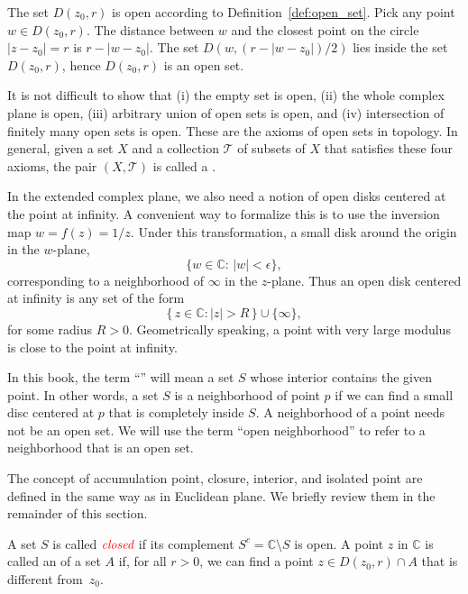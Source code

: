 \begin{example}
	The set $D(z_0,r)$ is open according to Definition~\ref{def:open_set}. Pick any point $w\in D(z_0,r)$. The distance between $w$ and the closest point on the circle $|z-z_0|=r$ is  $r - |w-z_0|$. The set $D(w, (r-|w-z_0|)/2)$ lies inside the set $D(z_0,r)$, hence $D(z_0,r)$ is an open set.
\end{example}

It is not difficult to show that (i) the empty set is open, (ii) the whole complex plane is open, (iii) arbitrary union of open sets is open, and (iv) intersection of finitely many open sets is open. These are the axioms of open sets in topology. In general, given a set $X$ and a collection $\mathcal{T}$ of subsets of $X$ that satisfies these four axioms, the pair $(X,\mathcal{T})$ is called a . 

\smallskip

In the extended complex plane, we also need a notion of open disks centered at the point at infinity. A convenient way to formalize this is to use the inversion map  $w =f(z)=1/z$. Under this transformation, a small disk around the origin in the $w$-plane,
$$\{w\in\mathbb{C}:\, |w|<\epsilon\},$$
corresponding to a neighborhood of $\infty$ in the $z$-plane. Thus an open disk centered at infinity is any set of the form
$$\{ \, z\in \mathbb{C}:|z|>R\, \} \cup \{ \infty \} ,$$
for some radius $R>0$. Geometrically speaking, a point with very large modulus is close to the point at infinity.



\begin{remark} 
	In this book, the term ``'' will mean a set $S$ whose interior contains the given point. In other words, a set $S$ is a neighborhood of point $p$ if we can find a small disc centered at $p$ that is completely inside $S$. A neighborhood of a point needs not be an open set. We will use the term ``open neighborhood'' to refer to a neighborhood that is an open set. 
\end{remark}


The concept of accumulation point, closure, interior, and isolated point are defined in the same way as in Euclidean plane. We briefly review them in the remainder of this section.

\begin{svgraybox}
	\begin{definition}  
A set $S$ is called ${\color{red} \emph{closed}}$ if its complement $S^c = \mathbb{C}\setminus S$ is open. A point $z$ in $\mathbb{C}$ is called an  of a set $A$ if, for all $r>0$, we can find a point $z\in D(z_0,r)\cap A$ that is different from~$z_0$.
	\end{definition}
\end{svgraybox}

